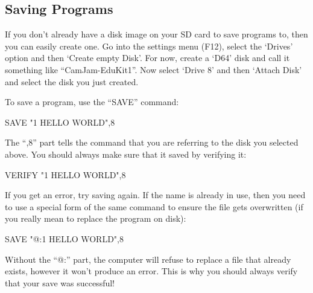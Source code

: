 \begin{titlepage}
\section*{Saving Programs}

If you don't already have a disk image on your SD card to save programs to, then you can easily create one.  Go into the settings menu (F12), select the `Drives' option and then `Create empty Disk'.  For now, create a `D64' disk and call it something like ``CamJam-EduKit1''.  Now select `Drive 8' and then `Attach Disk' and select the disk you just created.

To save a program, use the ``SAVE'' command:
\begin{code}
SAVE "1 HELLO WORLD",8
\end{code}

The ``,8'' part tells the command that you are referring to the disk you selected above.  You should always make sure that it saved by verifying it:
\begin{code}
VERIFY "1 HELLO WORLD",8
\end{code}

If you get an error, try saving again.  If the name is already in use, then you need to use a special form of the same command to ensure the file gets overwritten (if you really mean to replace the program on disk):
\begin{code}
SAVE "@:1 HELLO WORLD",8
\end{code}

Without the ``@:'' part, the computer will refuse to replace a file that already exists, however it won't produce an error.  This is why you should always verify that your save was successful!

\end{titlepage}

\tableofcontents

